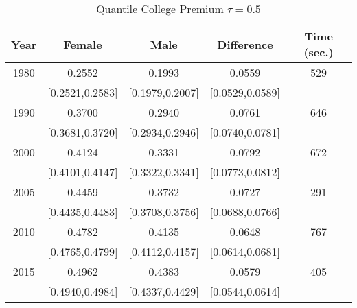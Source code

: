 \begin{table}[ht]
\centering
\begin{tabular}{ccccc}
  \hline
Year & Female & Male & Difference & Time (sec.) \\ 
  \hline
1980 & 0.2552 & 0.1993 & 0.0559 & 529 \\ 
   & [0.2521,0.2583] & [0.1979,0.2007] & [0.0529,0.0589] &  \\ 
  1990 & 0.3700 & 0.2940 & 0.0761 & 646 \\ 
   & [0.3681,0.3720] & [0.2934,0.2946] & [0.0740,0.0781] &  \\ 
  2000 & 0.4124 & 0.3331 & 0.0792 & 672 \\ 
   & [0.4101,0.4147] & [0.3322,0.3341] & [0.0773,0.0812] &  \\ 
  2005 & 0.4459 & 0.3732 & 0.0727 & 291 \\ 
   & [0.4435,0.4483] & [0.3708,0.3756] & [0.0688,0.0766] &  \\ 
  2010 & 0.4782 & 0.4135 & 0.0648 & 767 \\ 
   & [0.4765,0.4799] & [0.4112,0.4157] & [0.0614,0.0681] &  \\ 
  2015 & 0.4962 & 0.4383 & 0.0579 & 405 \\ 
   & [0.4940,0.4984] & [0.4337,0.4429] & [0.0544,0.0614] &  \\ 
   \hline
\end{tabular}
\caption{Quantile College Premium $\tau=0.5$} 
\end{table}
